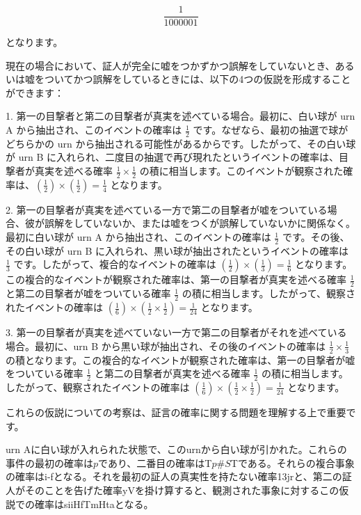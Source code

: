 \documentclass[a4paper,11pt,openany]{ltjsbook}
\begin{document}
$$
\frac{1}{1000001}
$$

となります。

現在の場合において、証人が完全に嘘をつかずかつ誤解をしていないとき、あるいは嘘をついてかつ誤解をしているときには、以下の4つの仮説を形成することができます：

1. 第一の目撃者と第二の目撃者が真実を述べている場合。最初に、白い球が urn A から抽出され、このイベントの確率は $\frac{1}{2}$ です。なぜなら、最初の抽選で球がどちらかの urn から抽出される可能性があるからです。したがって、その白い球が urn B に入れられ、二度目の抽選で再び現れたというイベントの確率は、目撃者が真実を述べる確率 $\frac{1}{2} \times \frac{1}{2}$ の積に相当します。このイベントが観察された確率は、$\left(\frac{1}{2}\right) \times \left(\frac{1}{2}\right) = \frac{1}{4}$ となります。

2. 第一の目撃者が真実を述べている一方で第二の目撃者が嘘をついている場合、彼が誤解をしていないか、または嘘をつくが誤解していないかに関係なく。最初に白い球が urn A から抽出され、このイベントの確率は $\frac{1}{2}$ です。その後、その白い球が urn B に入れられ、黒い球が抽出されたというイベントの確率は $\frac{1}{3}$ です。したがって、複合的なイベントの確率は $\left(\frac{1}{2}\right) \times \left(\frac{1}{3}\right) = \frac{1}{6}$ となります。この複合的なイベントが観察された確率は、第一の目撃者が真実を述べる確率 $\frac{1}{2}$ と第二の目撃者が嘘をついている確率 $\frac{1}{2}$ の積に相当します。したがって、観察されたイベントの確率は $\left(\frac{1}{6}\right) \times \left(\frac{1}{2} \times \frac{1}{2}\right) = \frac{1}{24}$ となります。

3. 第一の目撃者が真実を述べていない一方で第二の目撃者がそれを述べている場合。最初に、urn B から黒い球が抽出され、その後のイベントの確率は $\frac{1}{2} \times \frac{1}{3}$ の積となります。この複合的なイベントが観察された確率は、第一の目撃者が嘘をついている確率 $\frac{1}{2}$ と第二の目撃者が真実を述べる確率 $\frac{1}{2}$ の積に相当します。したがって、観察されたイベントの確率は $\left(\frac{1}{6}\right) \times \left(\frac{1}{2} \times \frac{1}{2}\right) = \frac{1}{24}$ となります。

これらの仮説についての考察は、証言の確率に関する問題を理解する上で重要です。

urn Aに白い球が入れられた状態で、このurnから白い球が引かれた。これらの事件の最初の確率は$p$であり、二番目の確率はT$p$\#$S$Tである。それらの複合事象の確率はi-fとなる。それを最初の証人の真実性を持たない確率13jrと、第二の証人がそのことを告げた確率yVを掛け算すると、観測された事象に対するこの仮説での確率はsiiHfTmHtaとなる。
\end{document}
